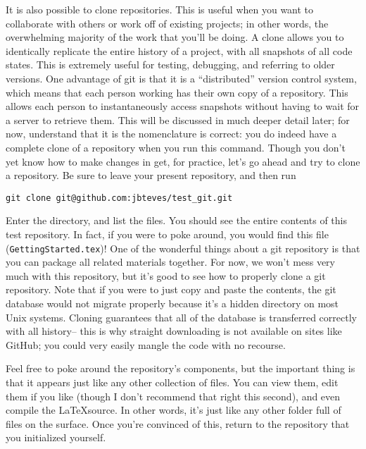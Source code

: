 \par{
It is also possible to clone repositories. This is useful when you want to
collaborate with others or work off of existing projects; in other words, the
overwhelming majority of the work that you'll be doing. A clone allows you to
identically replicate the entire history of a project, with all snapshots of
all code states. This is extremely useful for testing, debugging, and
referring to older versions. One advantage of git is that it is a
``distributed'' version control system, which means that each person working
has their own copy of a repository. This allows each person to instantaneously
access snapshots without having to wait for a server to retrieve them. This
will be discussed in much deeper detail later; for now, understand that it is
the nomenclature is correct: you do indeed have a complete clone of a
repository when you run this command. Though you don't yet know how to make
changes in get, for practice, let's go ahead and try to clone a repository.
Be sure to leave your present repository, and then run
}

\begin{verbatim}
git clone git@github.com:jbteves/test_git.git
\end{verbatim}

\par{
Enter the directory, and list the files. You should see the entire contents of
this test repository. In fact, if you were to poke around, you would find this
file (\verb+GettingStarted.tex+)! 
One of the wonderful things about a git repository is that you can
package all related materials together. For now, we won't mess very much with
this repository, but it's good to see how to properly clone a git repository.
Note that if you were to just copy and paste the contents, the git database
would not migrate properly because it's a hidden directory on most Unix
systems. Cloning guarantees that all of the database is transferred correctly
with all history-- this is why straight downloading is not available on sites
like GitHub; you could very easily mangle the code with no recourse.  
}

\par{
Feel free to poke around the repository's components, but the important thing
is that it appears just like any other collection of files. You can view them,
edit them if you like (though I don't recommend that right this second), and
even compile the \LaTeX source. In other words, it's just like any other
folder full of files on the surface. Once you're convinced of this, return to
the repository that you initialized yourself.
}
